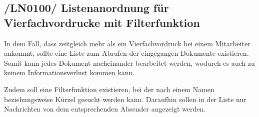 \subsection{/LN0100/ Listenanordnung für Vierfachvordrucke mit Filterfunktion}
In dem Fall, dass zeitgleich mehr als ein Vierfachvordruck bei einem Mitarbeiter ankommt, sollte eine Liste zum Abrufen der eingegangen Dokumente existieren. Somit kann jedes Dokument nacheinander bearbeitet werden, wodurch es auch zu keinem Informationsverlust kommen kann.

Zudem soll eine Filterfunktion existieren, bei der nach einem Namen beziehungsweise Kürzel gesucht werden kann. Daraufhin sollen in der Liste nur Nachrichten von dem entsprechenden Absender angezeigt werden.